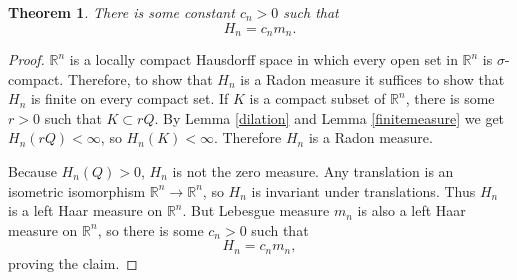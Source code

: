 \documentclass{article}
\newtheorem{theorem}{Theorem}
\theoremstyle{definition}
\begin{document}
\begin{theorem}
There is some constant $c_n>0$ such that 
\[
H_n = c_n m_n.
\]
\end{theorem}
\begin{proof}
$\mathbb{R}^n$ is a locally compact Hausdorff space in which
every open set in $\mathbb{R}^n$ is $\sigma$-compact. Therefore, to show that $H_n$ is a Radon measure it suffices to show that
$H_n$ is finite on every compact set.
If $K$ is a compact subset of $\mathbb{R}^n$, there is some $r>0$ such that $K \subset rQ$. By
Lemma \ref{dilation} and Lemma \ref{finitemeasure} we get
$H_n(rQ)<\infty$, so $H_n(K)<\infty$. Therefore $H_n$ is a Radon measure.

Because $H_n(Q)>0$, $H_n$ is not the zero measure. 
Any translation is an isometric isomorphism $\mathbb{R}^n \to \mathbb{R}^n$, so $H_n$ is invariant under translations.
Thus $H_n$ is a  left Haar measure on $\mathbb{R}^n$. But Lebesgue measure $m_n$ is also a left Haar measure on $\mathbb{R}^n$,
so there is some $c_n>0$ such that
\[
H_n = c_n m_n,
\]
proving the claim.
\end{proof}
\end{document}
